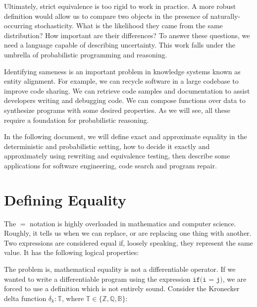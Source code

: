 \documentclass[11pt]{article}
\begin{document}
    Ultimately, strict equivalence is too rigid to work in practice. A more robust definition would allow us to compare two objects in the presence of naturally-occurring stochasticity. What is the likelihood they came from the same distribution? How important are their differences? To answer these questions, we need a language capable of describing uncertainty. This work falls under the umbrella of probabilistic programming and reasoning.

    Identifying sameness is an important problem in knowledge systems known as entity alignment. For example, we can recycle software in a large codebase to improve code sharing. We can retrieve code samples and documentation to assist developers writing and debugging code. We can compose functions over data to synthesize programs with some desired properties. As we will see, all these require a foundation for probabilistic reasoning.

    In the following document, we will define exact and approximate equality in the deterministic and probabilistic setting, how to decide it exactly and approximately using rewriting and equivalence testing, then describe some applications for software engineering, code search and program repair.

    \pagebreak

    \section{Defining Equality}

    The $=$ notation is highly overloaded in mathematics and computer science. Roughly, it tells us when we can replace, or are replacing one thing with another. Two expressions are considered equal if, loosely speaking, they represent the same value. It has the following logical properties:


    The problem is, mathematical equality is not a differentiable operator.
    If we wanted to write a differentiable program using the expression $\texttt{if(i = j)}$, we are forced to use a definition which is not entirely sound. Consider the Kronecker delta function $\delta_k: \mathbb{T}$, where $\mathbb{T} \in \{\mathbb{Z, Q, B}\}$:
\end{document}
